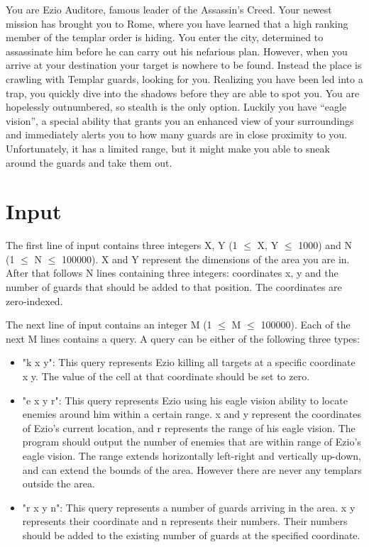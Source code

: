 

You are Ezio Auditore, famous leader of the Assassin’s Creed. Your newest mission has brought you to Rome, where you have learned that a high ranking member of the templar order is hiding. You enter the city, determined to assassinate him before he can carry out his nefarious plan.
However, when you arrive at your destination your target is nowhere to be found. Instead the place is crawling with Templar guards, looking for you. Realizing you have been led into a trap, you quickly dive into the shadows before they are able to spot you.
You are hopelessly outnumbered, so stealth is the only option. Luckily you have “eagle vision”, a special ability that grants you an enhanced view of your surroundings and immediately alerts you to how many guards are in close proximity to you. Unfortunately, it has a limited range, but it might make you able to sneak around the guards and take them out.

\section*{Input}

The first line of input contains three integers X, Y (1 $\le$ X, Y $\le$ 1000) and N (1 $\le$ N $\le$ 100000). X and Y represent the dimensions of the area you are in. After that follows N lines containing three integers: coordinates x, y and the number of guards that should be added to that position. The coordinates are zero-indexed.

The next line of input contains an integer M (1 $\le$ M $\le$ 100000). Each of the next M lines contains a query. A query can be either of the following three types:

\begin{itemize}
    \item "k x y": This query represents Ezio killing all targets at a specific coordinate x y. The value of the cell at that coordinate should be set to zero.
    \item "e x y r": This query represents Ezio using his eagle vision ability to locate enemies around him within a certain range. x and y represent the coordinates of Ezio's current location, and r represents the range of his eagle vision. The program should output the number of enemies that are within range of Ezio's eagle vision. The range extends horizontally left-right and vertically up-down, and can extend the bounds of the area. However there are never any templars outside the area.
    \item "r x y n": This query represents a number of guards arriving in the area. x y represents their coordinate and n represents their numbers. Their numbers should be added to the existing number of guards at the specified coordinate.
\end{itemize}


